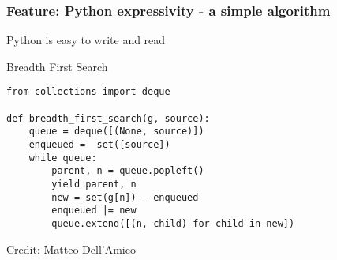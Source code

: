 \documentclass[xcolor=dvipsnames, 9pt]{beamer}
\begin{document}
  







\begin{frame}[fragile]
\frametitle{Feature: Python expressivity - a simple algorithm}
Python is easy to write and read
\begin{block}{Breadth First Search}
\begin{verbatim}
from collections import deque

def breadth_first_search(g, source):
    queue = deque([(None, source)])
    enqueued =  set([source])
    while queue:
        parent, n = queue.popleft()
        yield parent, n
        new = set(g[n]) - enqueued
        enqueued |= new
        queue.extend([(n, child) for child in new])
\end{verbatim}
\end{block}
Credit: Matteo Dell'Amico
\end{frame}



\end{document}
